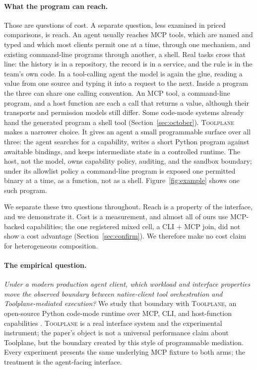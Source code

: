 \documentclass[10pt,twocolumn]{article}
\newcommand{\toolplane}{\textsc{Toolplane}\xspace}
\begin{document}
\paragraph{What the program can reach.}
Those are questions of cost.  A separate question, less examined in priced
comparisons, is reach.  An agent usually reaches MCP tools, which are named
and typed and which most clients permit one at a time, through one mechanism,
and existing command-line programs through another, a shell.  Real tasks
cross that line: the history is in a repository, the record is in a service,
and the rule is in the team's own code.  In a tool-calling agent the model is
again the glue, reading a value from one source and typing it into a request
to the next.  Inside a program the three can share one calling convention.
An MCP tool, a command-line program, and a host function are each a call that
returns a value, although their transports and permission models still
differ.  Some code-mode systems already hand the generated program a shell
tool (Section~\ref{sec:october}).  \toolplane makes a narrower choice.  It
gives an agent a small programmable surface over all three: the agent
searches for a capability, writes a short Python program against awaitable
bindings, and keeps intermediate state in a controlled runtime.  The host,
not the model, owns capability policy, auditing, and the sandbox boundary;
under its allowlist policy a command-line program is exposed one permitted
binary at a time, as a function, not as a shell.
Figure~\ref{fig:example} shows one such program.

We separate these two questions throughout.  Reach is a property of the
interface, and we demonstrate it.  Cost is a measurement, and almost all of
ours use MCP-backed capabilities; the one registered mixed cell, a CLI + MCP
join, did not show a cost advantage (Section~\ref{sec:confirm}).  We
therefore make no cost claim for heterogeneous composition.

\paragraph{The empirical question.}
\emph{Under a modern production agent client, which workload and interface
properties move the observed boundary between native-client tool
orchestration and Toolplane-mediated execution?}  We study that boundary with
\toolplane, an open-source Python code-mode runtime over MCP, CLI, and
host-function capabilities \cite{mcp2025spec,toolplane2026artifact}.
\toolplane is a real interface system and the experimental instrument; the
paper's object is not a universal performance claim about Toolplane, but the
boundary created by this style of programmable mediation.  Every experiment
presents the same underlying MCP fixture to both arms; the treatment is the
agent-facing interface.
\end{document}

